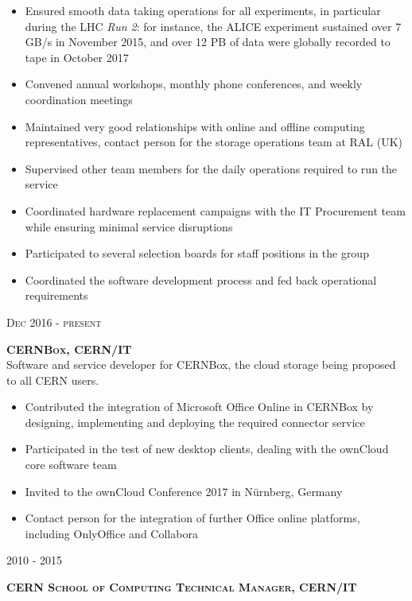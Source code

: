 \documentclass[11pt]{article}
\renewcommand{\subsection}[2]%
        {
         {\bf{\raggedright \scshape #1}}{\bf{\hfill \scshape #2}}\\[-.7\baselineskip]
}
\newenvironment{CompactItemize} {
  \begin{itemize}
  \setlength{\itemsep}{-3pt}
  \setlength{\parsep}{0pt}
  \setlength{\topsep}{-2pt}
  \setlength{\partopsep}{-2pt}
} {\end{itemize}}
\begin{document}
\begin{CompactItemize}
\item Ensured smooth data taking operations for all experiments, in particular during the LHC \emph{Run 2}: for instance, the ALICE experiment sustained over 7 GB/s in November 2015, and over 12 PB of data were globally recorded to tape in October 2017
\item Convened annual workshops, monthly phone conferences, and weekly coordination meetings
\item Maintained very good relationships with online and offline computing representatives, contact person for the storage operations team at RAL (UK)
\item Supervised other team members for the daily operations required to run the service
\item Coordinated hardware replacement campaigns with the IT Procurement team while ensuring minimal service disruptions
\item Participated to several selection boards for staff positions in the group
\item Coordinated the software development process and fed back operational requirements
\end{CompactItemize}

\subsection{Dec 2016 - present}{CERNBox, CERN/IT}

Software and service developer for CERNBox, the cloud storage being proposed to all CERN users.

\begin{CompactItemize}
\item Contributed the integration of Microsoft Office Online in CERNBox by designing, implementing and deploying the required connector service
\item Participated in the test of new desktop clients, dealing with the ownCloud core software team
\item Invited to the ownCloud Conference 2017 in N{\"u}rnberg, Germany
\item Contact person for the integration of further Office online platforms, including OnlyOffice and Collabora
\end{CompactItemize}

\subsection{2010 - 2015}{CERN School of Computing Technical Manager, CERN/IT}
\end{document}
